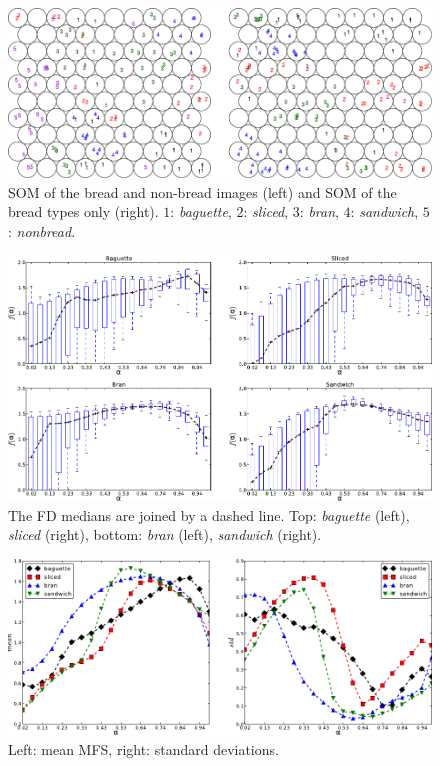 \documentclass[twocolumn]{bmcart}%
\begin{document}
\begin{backmatter}
\begin{figure}[h!]
\begin{centering}
\includegraphics{Fig4}
\caption{ SOM of the bread and non-bread images (left) and SOM of the bread types only (right). $1$: {\em baguette}, $2$: {\em sliced}, $3$: {\em bran}, $4$: {\em sandwich}, $5$: {\em nonbread}.}
\label{fig:somfractal}
\end{centering}
\end{figure}

\begin{figure}[h!]
\centering
\includegraphics{Fig5}
\caption{ The FD medians are joined by a dashed line. Top: {\em baguette} (left), {\em sliced} (right), bottom: {\em bran} (left), {\em sandwich} (right).}
\label{fig:boxplotsMFS}
\end{figure}

\begin{figure}[h!]
\centering
\includegraphics{Fig6}
\caption{ Left: mean MFS, right: standard deviations.}
\label{fig:meansMFS}
\end{figure}



\end{backmatter}
\end{document}
